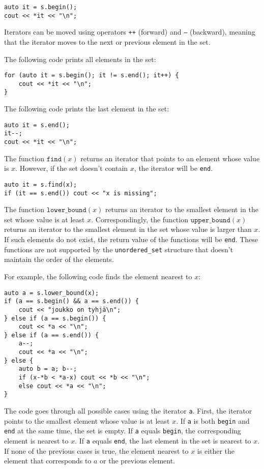 \begin{lstlisting}
auto it = s.begin();
cout << *it << "\n";
\end{lstlisting}

Iterators can be moved using operators
\texttt{++} (forward) and \texttt{---} (backward),
meaning that the iterator moves to the next
or previous element in the set.

The following code prints all elements in the set:
\begin{lstlisting}
for (auto it = s.begin(); it != s.end(); it++) {
    cout << *it << "\n";
}
\end{lstlisting}
The following code prints the last element in the set:
\begin{lstlisting}
auto it = s.end();
it--;
cout << *it << "\n";
\end{lstlisting}

The function $\texttt{find}(x)$ returns an iterator
that points to an element whose value is $x$.
However, if the set doesn't contain $x$,
the iterator will be \texttt{end}.

\begin{lstlisting}
auto it = s.find(x);
if (it == s.end()) cout << "x is missing";
\end{lstlisting}

The function $\texttt{lower\_bound}(x)$ returns
an iterator to the smallest element in the set
whose value is at least $x$.
Correspondingly, 
the function $\texttt{upper\_bound}(x)$
returns an iterator to the smallest element
in the set whose value is larger than $x$.
If such elements do not exist,
the return value of the functions will be \texttt{end}.
These functions are not supported by the
\texttt{unordered\_set} structure that
doesn't maintain the order of the elements.

\begin{samepage}
For example, the following code finds the element
nearest to $x$:

\begin{lstlisting}
auto a = s.lower_bound(x);
if (a == s.begin() && a == s.end()) {
    cout << "joukko on tyhjä\n";
} else if (a == s.begin()) {
    cout << *a << "\n";
} else if (a == s.end()) {
    a--;
    cout << *a << "\n";
} else {
    auto b = a; b--;
    if (x-*b < *a-x) cout << *b << "\n";
    else cout << *a << "\n";
}
\end{lstlisting}

The code goes through all possible cases
using the iterator \texttt{a}.
First, the iterator points to the smallest
element whose value is at least $x$.
If \texttt{a} is both \texttt{begin}
and \texttt{end} at the same time, the set is empty.
If \texttt{a} equals \texttt{begin},
the corresponding element is nearest to $x$.
If \texttt{a} equals \texttt{end},
the last element in the set is nearest to $x$.
If none of the previous cases is true,
the element nearest to $x$ is either the
element that corresponds to $a$ or the previous element.
\end{samepage}

